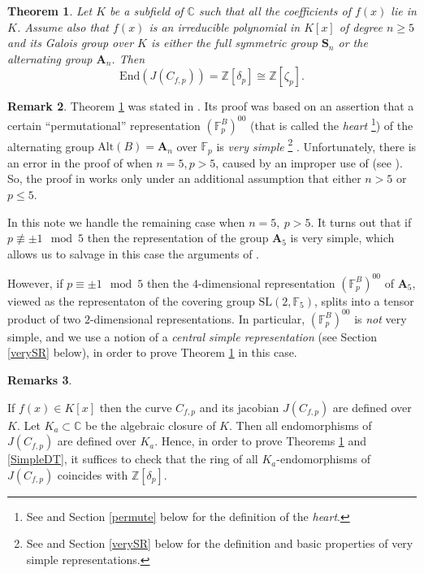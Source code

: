 \documentclass[12pt,a4paper,reqno]{amsart}
\def\Z{{\mathbb Z}}
\def\C{{\mathbb C}}
\def\F{{\mathbb F}}
\def\Sn{{\mathbf S}_n}
\def\An{{\mathbf A}_n}
\def\Alt{\mathrm{Alt}}
\def\End{\mathrm{End}}
\newtheorem{thm}{Theorem}[section]
\theoremstyle{definition}
\newtheorem{rem}[thm]{Remark}
\newtheorem{rems}[thm]{Remarks}
\begin{document}
\begin{thm}
\label{endo}
Let $K$ be a subfield of $\C$ such that all the coefficients of $f(x)$
lie in $K$. Assume also that $f(x)$ is an irreducible polynomial in $K[x]$
of degree $n \ge 5$
 and its Galois group over $K$ is either the full symmetric group $\Sn$ or
the alternating group $\An$.
Then
$$ \End(J(C_{f,p}))=\Z[\delta_p] \cong\Z[\zeta_p].$$
\end{thm}



\begin{rem}
\label{errorA5}
Theorem \ref{endo} was stated in \cite[Th. 4.2]{ZarhinCambridge}. Its proof was based on an assertion that  
a certain  ``permutational'' representation $(\F_p^B)^{00}$ (that is called the {\sl heart}
\footnote{See \cite{Mortimer,Klemm} and Section \ref{permute} below for the definition of the {\sl heart}.})
of the alternating group $\Alt(B)=\An$ over $\F_p$ is  {\sl very simple}
 \footnote{See \cite{ZarhinM,ZarhinClifford} and Section \ref{verySR} below for the definition and basic properties of very simple representations.}
  \cite[Th. 4.7]{ZarhinCrelle}. Unfortunately, 
there is an error in the proof of \cite[Th. 4.7]{ZarhinCrelle}  when $n=5, p>5$,  caused by an improper use of \cite[Cor. 4.4]{ZarhinCrelle} (see \cite[p. 108, lines 4-5]{ZarhinCrelle}).
So, the proof in \cite{ZarhinCambridge} works only under an additional assumption that either $n>5$ or $p \le 5$.

In this note we handle the remaining case when $n=5, \ p>5$. It turns out that if $p \not \equiv \pm 1 \ \bmod 5$
then the representation of the group $\mathbf{A}_5$ is very simple, which  allows us to salvage in this case the  arguments of \cite{ZarhinCrelle}.

However,  if $p\equiv \pm 1 \ \bmod 5$ then  the $4$-dimensional representation
$\left(\F_p^B\right)^{00}$ of  $\mathbf{A}_5$, viewed as the representaton of the covering group $\mathrm{SL}(2,\F_5)$, splits into a tensor
product of two $2$-dimensional representations. In particular, $\left(\F_p^B\right)^{00}$ is {\sl not} very simple, and we use a notion of a {\sl central simple representation}
(see Section \ref{verySR} below), in order 
to prove Theorem \ref{endo} in this case.
\end{rem}




\begin{rems}
\label{ribcom}

If $f(x) \in K[x]$ then the curve
$C_{f,p}$ and its jacobian $J(C_{f,p})$ are defined over $K$. Let $K_a\subset \C$ be the algebraic closure of $K$. 
Then all endomorphisms of $J(C_{f,p})$ are defined over $K_a$. Hence,  
 in order to prove Theorems \ref{endo} and \ref{SimpleDT}, it suffices to
check that the ring of all $K_a$-endomorphisms of  $J(C_{f,p})$ coincides with
 $\Z[\delta_p]$. 
 \end{rems}
 
\end{document}

